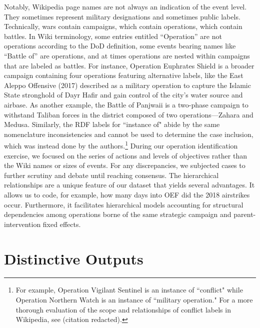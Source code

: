 \documentclass[fleqn,12pt]{article}
\begin{document}
Notably, Wikipedia page names are not always an indication of the event level. They sometimes represent military designations and sometimes public labels. Technically, wars contain campaigns, which contain operations, which contain battles. In Wiki terminology, some entries entitled ``Operation” are not operations according to the DoD definition, some events bearing names like ``Battle of” are operations, and at times operations are nested within campaigns that are labeled as battles. For instance, Operation Euphrates Shield is a broader campaign containing four operations featuring alternative labels, like the East Aleppo Offensive (2017) described as a military operation to capture the Islamic State stronghold of Dayr Hafir and gain control of the city’s water source and airbase. As another example, the Battle of Panjwaii is a two-phase campaign to withstand Taliban forces in the district composed of two operations—Zahara and Medusa. Similarly, the RDF labels for ``instance of" abide by the same nomenclature inconsistencies and cannot be used to determine the case inclusion, which was instead done by the authors.\footnote{For example, Operation Vigilant Sentinel is an instance of ``conflict" while Operation Northern Watch is an instance of ``military operation." For a more thorough evaluation of the scope and relationships of conflict labels in Wikipedia, see (citation redacted).} During our operation identification exercise, we focused on the series of actions and levels of objectives rather than the Wiki names or sizes of events. For any discrepancies, we subjected cases to further scrutiny and debate until reaching consensus. The hierarchical relationships are a unique feature of our dataset that yields several advantages. It allows us to code, for example, how many days into OEF did the 2018 airstrikes occur. Furthermore, it facilitates hierarchical models accounting for structural dependencies among operations borne of the same strategic campaign and parent-intervention fixed effects.

\section*{Distinctive Outputs}
\end{document}
